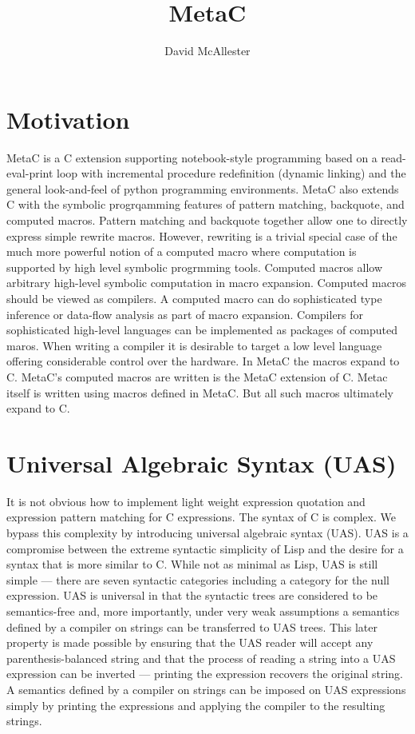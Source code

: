 \documentclass{article}
\title{MetaC}
\author{David McAllester}
\begin{document}
\maketitle

\section{Motivation}

\bigskip
\bigskip
MetaC is a C extension supporting notebook-style programming based on a read-eval-print loop with incremental procedure redefinition (dynamic linking) and the general look-and-feel of
python programming environments.  MetaC also extends C with the symbolic progrqamming features of pattern matching, backquote, and computed macros.
Pattern matching and backquote together allow one to directly express simple rewrite macros. However, rewriting is a trivial special case of the much more powerful notion
of a computed macro where computation is supported by high level symbolic progrmming tools.
Computed macros allow arbitrary high-level symbolic computation in macro expansion. Computed macros should be viewed as compilers.  A computed macro can do
sophisticated type inference or data-flow analysis as part of macro expansion.
Compilers for sophisticated high-level languages can be implemented as packages of computed maros.
When writing a compiler it is desirable to target a low level language offering considerable control over the hardware.  In MetaC the macros
expand to C.  MetaC's computed macros are written is the MetaC extension of C.  Metac itself is written using macros defined in MetaC.  But all such macros ultimately expand to
C.

\section{Universal Algebraic Syntax (UAS)}

It is not obvious how to implement light weight expression quotation and expression pattern matching for C expressions.  The syntax of C is complex.  We bypass this complexity by introducing universal algebraic syntax (UAS).
UAS is a compromise between the extreme syntactic simplicity of Lisp and the desire for a syntax that is more similar to C.
While not as minimal as Lisp, UAS is still simple --- there are seven syntactic categories including a category for the null expression.
UAS is universal in that the syntactic trees are considered to be semantics-free and, more importantly, under very weak assumptions a semantics defined by a compiler on strings
can be transferred to UAS trees.
This later property is made possible by ensuring that the UAS reader will accept any parenthesis-balanced string
and that the process of reading a string into a UAS expression can be inverted --- printing the expression recovers the original string.
A semantics defined by a compiler on strings can be imposed on UAS expressions simply by printing the expressions and applying the compiler to the resulting strings.
\end{document}
